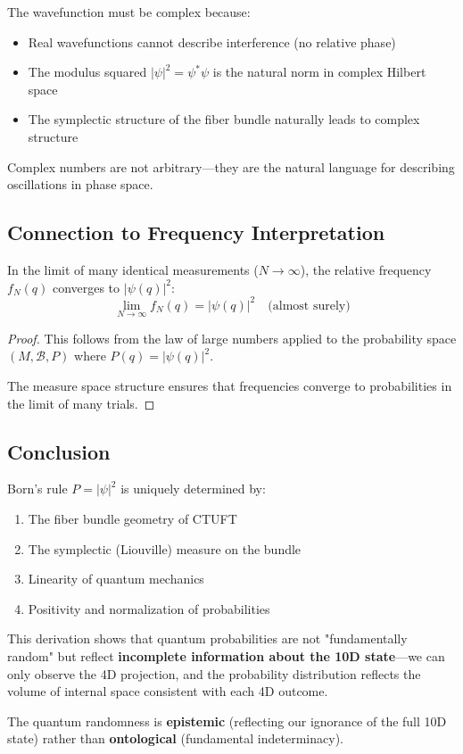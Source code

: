 \begin{insight}
The wavefunction must be complex because:
\begin{itemize}
    \item Real wavefunctions cannot describe interference (no relative phase)
    \item The modulus squared $|\psi|^2 = \psi^*\psi$ is the natural norm in complex Hilbert space
    \item The symplectic structure of the fiber bundle naturally leads to complex structure
\end{itemize}
Complex numbers are not arbitrary—they are the natural language for describing oscillations in phase space.
\end{insight}

\subsection{Connection to Frequency Interpretation}

\begin{theorem}
In the limit of many identical measurements ($N \to \infty$), the relative frequency $f_N(q)$ converges to $|\psi(q)|^2$:
\begin{equation}
    \lim_{N \to \infty} f_N(q) = |\psi(q)|^2 \quad \text{(almost surely)}
\end{equation}
\end{theorem}

\begin{proof}
This follows from the law of large numbers applied to the probability space $(M, \mathcal{B}, P)$ where $P(q) = |\psi(q)|^2$.

The measure space structure ensures that frequencies converge to probabilities in the limit of many trials.
\end{proof}

\subsection{Conclusion}

\begin{theorem}
Born's rule $P = |\psi|^2$ is uniquely determined by:
\begin{enumerate}
    \item The fiber bundle geometry of CTUFT
    \item The symplectic (Liouville) measure on the bundle
    \item Linearity of quantum mechanics
    \item Positivity and normalization of probabilities
\end{enumerate}
\end{theorem}

This derivation shows that quantum probabilities are not "fundamentally random" but reflect \textbf{incomplete information about the 10D state}—we can only observe the 4D projection, and the probability distribution reflects the volume of internal space consistent with each 4D outcome.

The quantum randomness is \textbf{epistemic} (reflecting our ignorance of the full 10D state) rather than \textbf{ontological} (fundamental indeterminacy).
